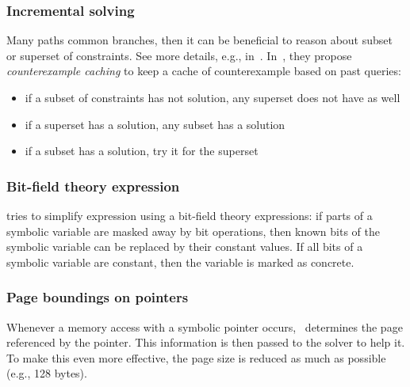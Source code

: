 \subsubsection{Incremental solving} Many paths common branches, then it can be beneficial to reason about subset or superset of constraints. See more details, e.g., in~\cite{KLEE-OSDI08,CUTE-FSE13}. In~\cite{KLEE-OSDI08}, they propose {\em counterexample caching} to keep a cache of counterexample based on past queries:
      \begin{itemize}
        \item if a subset of constraints has not solution, any superset does not have as well
        \item if a superset has a solution, any subset has a solution
        \item if a subset has a solution, try it for the superset
      \end{itemize}

\subsubsection{Bit-field theory expression} \cite{CKC-TOCS12} tries to simplify expression using a bit-field theory expressions: if parts of a symbolic variable are masked away by bit operations, then known bits of the symbolic variable can be replaced by their constant values. If all bits of a symbolic variable are constant, then the variable is marked as concrete.

\fi

\subsubsection{Page boundings on pointers} Whenever a memory access with a symbolic pointer occurs,~\cite{CKC-TOCS12} determines the page referenced by the pointer. This information is then passed to the solver to help it. To make this even more effective, the page size is reduced as much as possible (e.g., 128 bytes).


